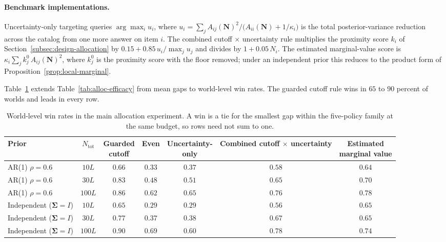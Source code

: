 \documentclass[11pt]{article}
\theoremstyle{definition}
\theoremstyle{remark}
\newcommand{\1}{\mathbf{1}}
\newcommand{\bSigma}{\boldsymbol{\Sigma}}
\newcommand{\N}{\mathbf{N}}
\begin{document}
\paragraph{Benchmark implementations.}
Uncertainty-only targeting queries \(\arg\max_i u_i\), where
\(u_i=\sum_j A_{ij}(\N)^2/\big(A_{ii}(\N)+1/\kappa_i\big)\) is
the total posterior-variance reduction across the catalog from one more
answer on item \(i\). The combined cutoff \(\times\) uncertainty
rule multiplies the proximity score \(k_i\) of
Section~\ref{subsec:design-allocation} by
\(0.15+0.85\,u_i/\max_j u_j\) and divides by \(1+0.05\,N_i\).
The estimated marginal-value score is
\(\kappa_i\sum_j k^0_j\,A_{ij}(\N)^2\), where \(k^0_j\) is the
proximity score with the floor removed; under an independent prior this
reduces to the product form of
Proposition~\ref{prop:local-marginal}.

Table~\ref{tab:alloc-win-rates} extends Table~\ref{tab:alloc-efficacy}
from mean gaps to world-level win rates. The guarded cutoff rule
wins in \(65\) to \(90\) percent of worlds and leads in every row.

\begin{table}[h!]
\centering
\scriptsize
\setlength{\tabcolsep}{4pt}
\begin{tabular}{lcccccc}
\toprule
Prior & $N_{\mathrm{tot}}$ & \shortstack{Guarded\\cutoff} & Even & \shortstack{Uncertainty-\\only} & \shortstack{Combined cutoff\\$\times$ uncertainty} & \shortstack{Estimated\\marginal value} \\
\midrule
AR(1) $\rho=0.6$            & $10L$  & $0.66$ & $0.33$ & $0.37$ & $0.58$ & $0.64$ \\
AR(1) $\rho=0.6$            & $30L$  & $0.83$ & $0.48$ & $0.51$ & $0.65$ & $0.70$ \\
AR(1) $\rho=0.6$            & $100L$ & $0.86$ & $0.62$ & $0.65$ & $0.76$ & $0.78$ \\
Independent ($\bSigma{=}I$) & $10L$  & $0.65$ & $0.29$ & $0.29$ & $0.56$ & $0.65$ \\
Independent ($\bSigma{=}I$) & $30L$  & $0.77$ & $0.37$ & $0.38$ & $0.67$ & $0.65$ \\
Independent ($\bSigma{=}I$) & $100L$ & $0.90$ & $0.69$ & $0.60$ & $0.78$ & $0.74$ \\
\bottomrule
\end{tabular}
\caption{World-level win rates in the main allocation experiment. A win is a tie for the smallest gap within the five-policy family at the same budget, so rows need not sum to one.}
\label{tab:alloc-win-rates}
\end{table}
\end{document}
